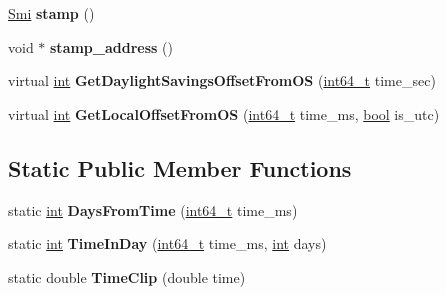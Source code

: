 \begin{DoxyCompactItemize}
\item 
\mbox{\label{classv8_1_1internal_1_1DateCache_acf1e18f66ed74930a85b907234432e22}} 
\mbox{\hyperlink{classv8_1_1internal_1_1Smi}{Smi}} {\bfseries stamp} ()
\item 
\mbox{\label{classv8_1_1internal_1_1DateCache_ae977601d5642d31a9b6ed482fb5bc869}} 
void $\ast$ {\bfseries stamp\+\_\+address} ()
\item 
\mbox{\label{classv8_1_1internal_1_1DateCache_a0414713d5ff25ceba3e28895eac1a11d}} 
virtual \mbox{\hyperlink{classint}{int}} {\bfseries Get\+Daylight\+Savings\+Offset\+From\+OS} (\mbox{\hyperlink{classint64__t}{int64\+\_\+t}} time\+\_\+sec)
\item 
\mbox{\label{classv8_1_1internal_1_1DateCache_ab56bd835f7daa10c1069c21de6ae3772}} 
virtual \mbox{\hyperlink{classint}{int}} {\bfseries Get\+Local\+Offset\+From\+OS} (\mbox{\hyperlink{classint64__t}{int64\+\_\+t}} time\+\_\+ms, \mbox{\hyperlink{classbool}{bool}} is\+\_\+utc)
\end{DoxyCompactItemize}
\subsection*{Static Public Member Functions}
\begin{DoxyCompactItemize}
\item 
\mbox{\label{classv8_1_1internal_1_1DateCache_aad8fb01f0a57bc43277def6da5993aae}} 
static \mbox{\hyperlink{classint}{int}} {\bfseries Days\+From\+Time} (\mbox{\hyperlink{classint64__t}{int64\+\_\+t}} time\+\_\+ms)
\item 
\mbox{\label{classv8_1_1internal_1_1DateCache_a3027a581b156086c088deca2a2a5f768}} 
static \mbox{\hyperlink{classint}{int}} {\bfseries Time\+In\+Day} (\mbox{\hyperlink{classint64__t}{int64\+\_\+t}} time\+\_\+ms, \mbox{\hyperlink{classint}{int}} days)
\item 
\mbox{\label{classv8_1_1internal_1_1DateCache_a37932561aeab196de5dee4aaaf2fa82e}} 
static double {\bfseries Time\+Clip} (double time)
\end{DoxyCompactItemize}
